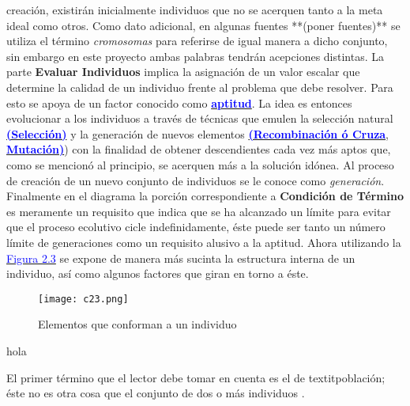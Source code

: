 \documentclass[class=report, crop=false]{standalone}
\begin{document}
creación, existirán inicialmente individuos que no se acerquen 
tanto a la meta ideal como otros.\break
Como dato adicional, en algunas fuentes **(poner fuentes)** se 
utiliza el término \textit{cromosomas} para referirse de igual 
manera a dicho conjunto, sin embargo en este proyecto ambas 
palabras tendrán acepciones distintas.\medskip\break
La parte \textbf{Evaluar Individuos} implica la asignación de 
un valor escalar que determine la calidad de un individuo frente 
al problema que debe resolver. Para esto se apoya de un factor 
conocido como \hyperref[sec:c2_3]{\textbf{\textcolor{blue}{aptitud}}}.\medskip\break
La idea es entonces evolucionar a los individuos a través de 
técnicas que emulen la selección natural \hyperref[sec:c2_4]{\textbf{\textcolor{blue}{(Selección)}}}
y la generación de nuevos elementos \hyperref[sec:c2_5]{\textbf{\textcolor{blue}{(Recombinación ó Cruza}}}, \hyperref[sec:c2_6]{\textbf{\textcolor{blue}{Mutación)}}}) con la finalidad de obtener descendientes cada vez 
más aptos que, como se mencionó al principio, se acerquen más 
a la solución idónea.\break
Al proceso de creación de un nuevo conjunto de individuos se le 
conoce como \textit{generación}.\medskip\break 
Finalmente en el diagrama la porción correspondiente a \textbf{Condición de Término}
es meramente un requisito que indica que se ha alcanzado un 
límite para evitar que el proceso ecolutivo cicle indefinidamente, 
éste puede ser tanto un número límite de generaciones como un 
requisito alusivo a la aptitud.\medskip\break
Ahora utilizando la \hyperref[sec:c2_7]{\textcolor{blue}{Figura 2.3}} 
se expone de manera más sucinta la estructura interna de un 
individuo, así como algunos factores que giran en torno a 
éste.%
\begin{figure}[ht]
\centering
\label{sec:c2_7}
\texttt{[image: c23.png]}
\caption{Elementos que conforman a un individuo}
\end{figure}\break


\begin{definition} 
hola 
\end{definition}

El primer término que el lector debe tomar en 
cuenta es el de textit{población}; éste no es otra cosa que el 
conjunto de dos o más individuos .\break
\end{document}
